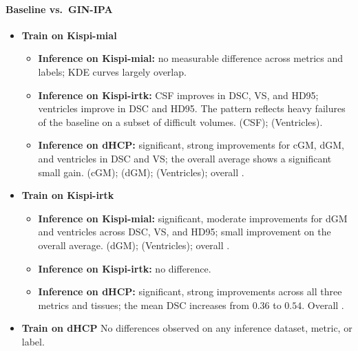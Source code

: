 \paragraph{Baseline vs.\ GIN-IPA}
\begin{itemize}
    \item \textbf{Train on Kispi-mial}
    \begin{itemize}
        \item \textbf{Inference on Kispi-mial:} no measurable difference across metrics and labels; KDE curves largely overlap.
        \item \textbf{Inference on Kispi-irtk:} CSF improves in DSC, VS, and HD95; ventricles improve in DSC and HD95. The pattern reflects heavy failures of the baseline on a subset of difficult volumes. \stats{\,}{\,} (CSF); \stats{\,}{\,} (Ventricles).
        \item \textbf{Inference on dHCP:} significant, strong improvements for cGM, dGM, and ventricles in DSC and VS; the overall average shows a significant small gain. \stats{\,}{\,} (cGM); \stats{\,}{\,} (dGM); \stats{\,}{\,} (Ventricles); overall \stats{\,}{\,}.
    \end{itemize}
    \item \textbf{Train on Kispi-irtk}
    \begin{itemize}
        \item \textbf{Inference on Kispi-mial:} significant, moderate improvements for dGM and ventricles across DSC, VS, and HD95; small improvement on the overall average. \stats{\,}{\,} (dGM); \stats{\,}{\,} (Ventricles); overall \stats{\,}{\,}.
        \item \textbf{Inference on Kispi-irtk:} no difference.
        \item \textbf{Inference on dHCP:} significant, strong improvements across all three metrics and tissues; the mean DSC increases from $0.36$ to $0.54$. Overall \stats{\,}{\,}.
    \end{itemize}
    \item \textbf{Train on dHCP}
    No differences observed on any inference dataset, metric, or label.
\end{itemize}

